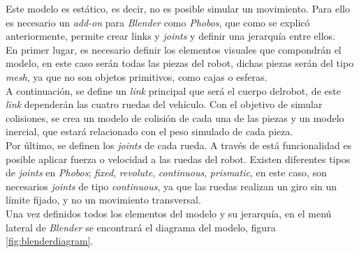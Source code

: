 Este modelo es estático, es decir, no es posible simular un movimiento. Para ello es necesario un \textit{add-on} para \textit{Blender} como \textit{Phobos}, que como se explicó anteriormente, permite crear links y \textit{joints} y definir una jerarquía entre ellos.\\

En primer lugar, es necesario definir los elementos visuales que compondrán el modelo, en este caso serán todas las piezas del robot, dichas piezas serán del tipo \textit{mesh}, ya que no son objetos primitivos, como cajas o esferas.\\

A continuación, se define un \textit{link} principal que será el cuerpo delrobot, de este \textit{link} dependerán las cuatro ruedas del vehículo. Con el objetivo de simular colisiones, se crea un modelo de colisión de cada una de
las piezas y un modelo inercial, que estará relacionado con el peso simulado de cada pieza.\\

Por último, se definen los \textit{joints} de cada rueda. A través de está funcionalidad es posible aplicar fuerza o velocidad a las ruedas del robot. Existen diferentes tipos de \textit{joints} en \textit{Phobos}; \textit{fixed}, \textit{revolute}, \textit{continuous}, \textit{prismatic}, en este caso, son necesarios \textit{joints} de tipo \textit{continuous}, ya que las ruedas realizan un giro sin un límite fijado, y no un movimiento transversal.\\

Una vez definidos todos los elementos del modelo y su jerarquía, en el menú lateral de \textit{Blender} se encontrará el diagrama del modelo, figura \ref{fig:blenderdiagram}.\\


